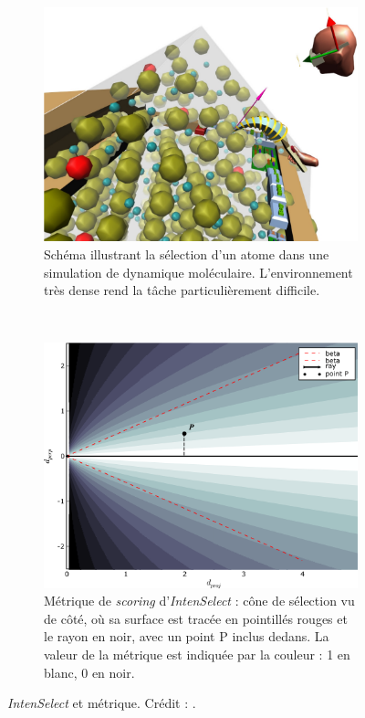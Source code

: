 	\begin{figure}[!htbp]
		\begin{subfigure}[t]{0.49\textwidth}
			\centering
			\includegraphics[width=\textwidth]{figures/ch2/intensMD}
			\caption{Schéma illustrant la sélection d'un atome dans une simulation de dynamique moléculaire. L'environnement très dense rend la tâche particulièrement difficile.}
			\label{fig:intensMD}
		\end{subfigure}
		~
		\begin{subfigure}[t]{0.49\textwidth}
			\centering
			\includegraphics[width=\textwidth]{figures/ch2/intensMetric}
			\caption{Métrique de \emph{scoring} d'\emph{IntenSelect} : cône de sélection vu de côté, où sa surface est tracée en pointillés rouges et le rayon en noir, avec un point P inclus dedans. La valeur de la métrique est indiquée par la couleur : 1 en blanc, 0 en noir.}
			\label{fig:intensMetric}
		\end{subfigure}
		\caption[\emph{IntenSelect} et métrique]{\emph{IntenSelect} et métrique. Crédit : \cite{de2005intenselect}.}
		\label{fig:plop}
	\end{figure}
	
